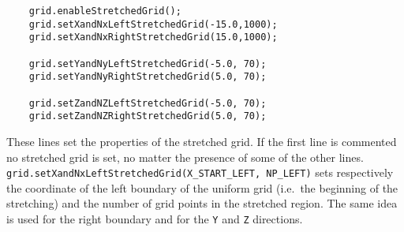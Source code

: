 \documentclass[11pt,a4paper]{report}
\begin{document}
\begin{lstlisting}
	grid.enableStretchedGrid();
	grid.setXandNxLeftStretchedGrid(-15.0,1000);
	grid.setXandNxRightStretchedGrid(15.0,1000);

	grid.setYandNyLeftStretchedGrid(-5.0, 70);
	grid.setYandNyRightStretchedGrid(5.0, 70);

	grid.setZandNZLeftStretchedGrid(-5.0, 70);
	grid.setZandNZRightStretchedGrid(5.0, 70);
\end{lstlisting}
These lines set the properties of the stretched grid.
If the first line is commented no stretched grid is set, no matter the presence of some of the other lines.
\texttt{grid.setXandNxLeftStretchedGrid(X\_START\_LEFT, NP\_LEFT)}
sets respectively the coordinate of the left boundary of the uniform grid (i.e.\ the beginning of the stretching) and the number of grid points in the stretched region.
The same idea is used for the right boundary and for the \verb+Y+ and \verb+Z+
directions.
\end{document}
